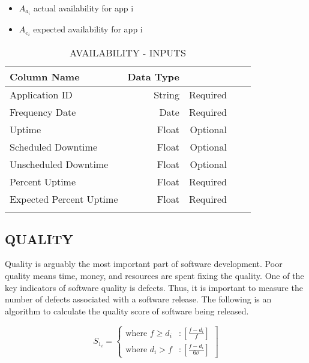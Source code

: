 \documentclass[SDSUThesis.tex]{subfiles}
\begin{document}
\begin{itemize}
\item $A_{a_i}$ actual availability for app i
\item $A_{e_i}$ expected availability for app i
\end{itemize}

\begin{longtable}{@{}l rr rr}

\toprule%
 \centering%
 {\bfseries Column Name}
 & {\bfseries Data Type}
 &  \\

\cmidrule[0.4pt](r{0.125em}){1-1}%
\cmidrule[0.4pt](lr{0.125em}){2-2}%
\cmidrule[0.4pt](l{0.125em}){3-3}%
\endhead

Application ID & String  & Required \\
\myrowcolour%
Frequency Date & Date & Required \\
Uptime & Float & Optional \\
\myrowcolour%
Scheduled Downtime & Float & Optional \\
Unscheduled Downtime & Float  & Optional \\
\myrowcolour%
Percent Uptime & Float & Required \\
Expected Percent Uptime & Float & Required \\

\bottomrule

\caption{AVAILABILITY - INPUTS}
\label{tab:avail}
\end{longtable}


\subsection{QUALITY}
Quality is arguably the most important part of software development.  Poor quality means time, money, and resources are spent 
fixing the quality.  One of the key indicators of software quality is defects.  Thus, it is important
to measure the number of defects associated with a software release.  The following is an algorithm to calculate
the quality score of software being released. 


\begin{displaymath}
   S_{1_i} = \left\{
     \begin{array}{lr}
       \text{where } f \geq d_i & : \left[ \frac{f - d_i}{f} \right] \\
       \text{where } d_i > f  & : \left[ \frac{f-d_i }{6\sigma} \right]
     \end{array}
   \right]
\end{displaymath} 
\end{document}
